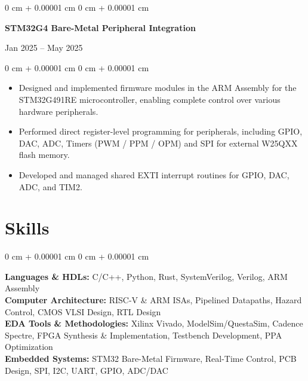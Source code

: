 \documentclass[10pt, letterpaper]{article}
\newenvironment{highlights}{
    \begin{itemize}[
        topsep=0.10 cm,
        parsep=0.10 cm,
        partopsep=0pt,
        itemsep=0pt,
        leftmargin=0 cm + 10pt
    ]
}{
    \end{itemize}
} %
\newenvironment{onecolentry}{
    \begin{adjustwidth}{
        0 cm + 0.00001 cm
    }{
        0 cm + 0.00001 cm
    }
}{
    \end{adjustwidth}
} %
\newenvironment{twocolentry}[2][]{
    \onecolentry
    \def\secondColumn{#2}
    \setcolumnwidth{\fill, 4.5 cm}
    \begin{paracol}{2}
}{
    \switchcolumn \raggedleft \secondColumn
    \end{paracol}
    \endonecolentry
} %
\begin{document}
        \vspace{0.2 cm}

        \begin{twocolentry}{
            Jan 2025 – May 2025
        }
            \textbf{STM32G4 Bare-Metal Peripheral Integration}
        \end{twocolentry}
        \vspace{0.10 cm}
        \begin{onecolentry}
            \begin{highlights}
                \item Designed and implemented firmware modules in the ARM Assembly for the STM32G491RE microcontroller, enabling complete control over various hardware peripherals.
                \item Performed direct register-level programming for peripherals, including GPIO, DAC, ADC, Timers (PWM / PPM / OPM) and SPI for external W25QXX flash memory.
                \item Developed and managed shared EXTI interrupt routines for GPIO, DAC, ADC, and TIM2.
            \end{highlights}
        \end{onecolentry}

    \section{Skills}
        \begin{onecolentry}
            \textbf{Languages \& HDLs:} C/C++, Python, Rust, SystemVerilog, Verilog, ARM Assembly \\
            \textbf{Computer Architecture:} RISC-V \& ARM ISAs, Pipelined Datapaths, Hazard Control, CMOS VLSI Design, RTL Design \\
            \textbf{EDA Tools \& Methodologies:} Xilinx Vivado, ModelSim/QuestaSim, Cadence Spectre, FPGA Synthesis \& Implementation, Testbench Development, PPA Optimization \\
            \textbf{Embedded Systems:} STM32 Bare-Metal Firmware, Real-Time Control, PCB Design, SPI, I2C, UART, GPIO, ADC/DAC
        \end{onecolentry}
\end{document}
